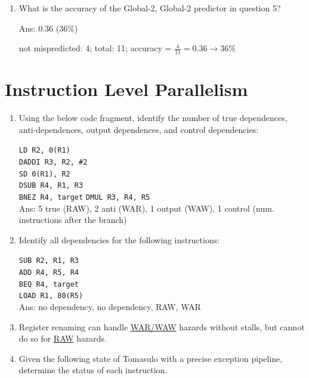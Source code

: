 \documentclass[12pt]{article}
\begin{document}
\begin{enumerate}
        \item What is the accuracy of the Global-2, Global-2 predictor in question 5?
        
        Ans: 0.36 (36\%)

        not mispredicted: 4; total: 11; accuracy = $\frac{4}{11} = 0.36 \longrightarrow 36\%$

    \end{enumerate}

    \section{Instruction Level Parallelism}

    \begin{enumerate}
        \item Using the below code fragment, identify the number of true dependences, anti-dependences, output dependences, 
        and control dependencies:

        \texttt{LD R2, 0(R1)}\\
        \texttt{DADDI R3, R2, \#2}\\
        \texttt{SD 0(R1), R2}\\
        \texttt{DSUB R4, R1, R3}\\
        \texttt{BNEZ R4, target}
        \texttt{DMUL R3, R4, R5}\\

        Ans: 5 true (RAW), 2 anti (WAR), 1 output (WAW), 1 control (num. instructions after the branch)

        \item Identify all dependencies for the following instructions:
        
        \texttt{SUB R2, R1, R3}\\
        \texttt{ADD R4, R5, R4}\\
        \texttt{BEQ R4, target}\\
        \texttt{LOAD R1, 80(R5)}\\

        Ans: no dependency, no dependency, RAW, WAR

        \item Register renaming can handle \underline{WAR/WAW} hazards without stalls, but cannot do so for 
        \underline{RAW} hazards.

        \item Given the following state of Tomasulo with a precise exception pipeline, determine the status of each 
        instruction.


\end{enumerate}
\end{document}
